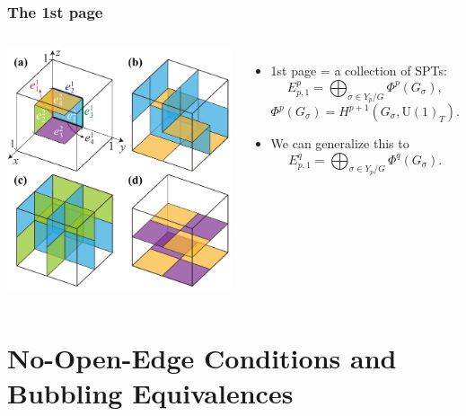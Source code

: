 \documentclass[xcolor=table, 11pt, aspectratio=43]{beamer}
\newcommand{\uone}{\mathrm U(1)}
\begin{document}
\begin{frame}
	\frametitle{The 1st page}

	\begin{columns}
		\begin{center}
			\includegraphics[width=\textwidth]{blocks}
		\end{center}
		\begin{itemize}
			\item 1st page = a collection of SPTs:
			\[E^p_{p,1} = \bigoplus_{\sigma\in Y_p/G} \Phi^p(G_\sigma),\]
			\[\Phi^p(G_\sigma) = H^{p+1}(G_\sigma, \uone_T).\]
			\item We can generalize this to
			\[E^q_{p,1} = \bigoplus_{\sigma\in Y_p/G} \Phi^q(G_\sigma).\]
		\end{itemize}
	\end{columns}
\end{frame}

\section{No-Open-Edge Conditions and Bubbling Equivalences}
\end{document}
